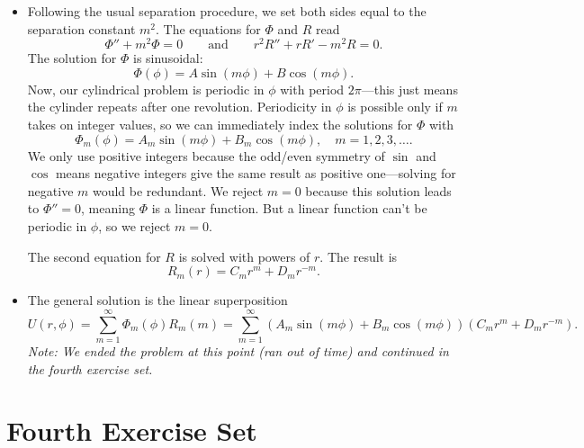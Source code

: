 \documentclass[11pt, a4paper]{article}
\newcommand{\eqtext}[1]{\qquad \text{#1} \qquad}
\begin{document}
\begin{itemize}
	\item Following the usual separation procedure, we set both sides equal to the separation constant $ m^{2} $. The equations for $ \Phi $ and $ R $ read
	\begin{equation*}
		\Phi'' + m^{2} \Phi = 0 \eqtext{and} r^{2}R'' + rR' - m^{2}R = 0.
	\end{equation*}
	The solution for $ \Phi $ is sinusoidal:
	\begin{equation*}
		\Phi(\phi) = A \sin(m\phi) + B\cos(m\phi).
	\end{equation*}
	Now, our cylindrical problem is periodic in $ \phi $ with period $ 2\pi $---this just means the cylinder repeats after one revolution. Periodicity in $ \phi $ is possible only if $ m $ takes on integer values, so we can immediately index the solutions for $ \Phi $ with
	\begin{equation*}
		\Phi_{m}(\phi) = A_{m} \sin(m\phi) + B_{m}\cos(m\phi), \quad m = 1, 2, 3, \ldots .
	\end{equation*}
	We only use positive integers because the odd/even symmetry of $ \sin $ and $ \cos $ means negative integers give the same result as positive one---solving for negative $ m $ would be redundant. We reject $ m = 0 $ because this solution leads to $ \Phi'' = 0 $, meaning $ \Phi $ is a linear function. But a linear function can't be periodic in $ \phi $, so we reject $ m = 0 $.
	
	The second equation for $ R $ is solved with powers of $ r $. The result is
	\begin{equation*}
		R_{m}(r) = C_{m}r^{m} + D_{m}r^{-m}.
	\end{equation*}
	
	\item The general solution is the linear superposition
	\begin{equation*}
		U(r, \phi) = \sum_{m = 1}^{\infty}\Phi_{m}(\phi)R_{m}(m) = \sum_{m = 1}^{\infty} \left(A_{m} \sin(m\phi) + B_{m}\cos(m\phi)\right)\left( C_{m}r^{m} + D_{m}r^{-m} \right).
	\end{equation*}
	\textit{Note: We ended the problem at this point (ran out of time) and continued in the fourth exercise set.}

	\end{itemize}
	
\newpage
\section{Fourth Exercise Set}
\end{document}

